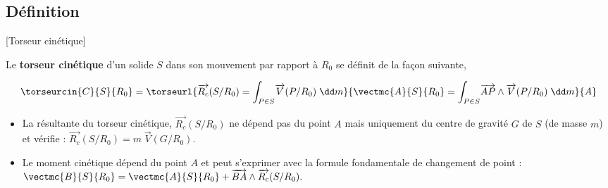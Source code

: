 \subsection{Définition}[Torseur cinétique]
  \begin{defi}%
Le \textbf{torseur cinétique} d'un solide $S$ dans son mouvement par rapport à $R_0$ se définit de la façon suivante,

$$
\torseurcin{C}{S}{R_0}=\torseurl{\overrightarrow{R_c}(S/R_0)=\displaystyle{\int_{P\in S}}\overrightarrow{V}(P/R_0)\;\dd m}{\vectmc{A}{S}{R_0}=\displaystyle{\int_{P\in S}}\overrightarrow{AP}\wedge \overrightarrow{V}(P/R_0)\;\dd m}{A}
$$

\begin{itemize}
\item La résultante du torseur cinétique, $\overrightarrow{R_c}(S/R_0)$ ne dépend pas du point $A$ mais uniquement du centre de gravité $G$ de $S$ (de masse $m$) et vérifie :
$\overrightarrow{R_c}(S/R_0)=m\;\overrightarrow{V}(G/R_0).
$
\item Le moment cinétique dépend du point $A$ et peut s'exprimer avec la formule fondamentale de changement de point :
$
\vectmc{B}{S}{R_0}=\vectmc{A}{S}{R_0}+\overrightarrow{BA}\wedge \overrightarrow{R_c}(S/R_0).
$
\end{itemize}

\end{defi}


%
%
%
%
%
%

